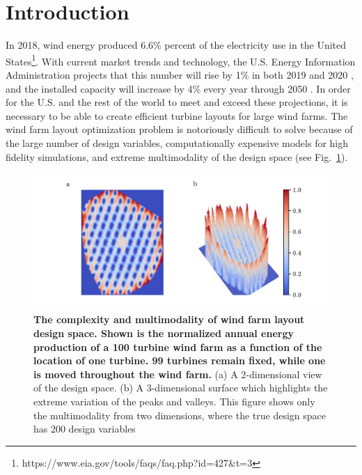\documentclass[wes, manuscript]{copernicus}
\begin{document}
\author[]{Andrew P.J. Stanley and Andrew Ning}





\section{Introduction}

In 2018, wind energy produced 6.6\% percent of the electricity use in the United States\footnote{https://www.eia.gov/tools/faqs/faq.php?id=427\&t=3}. With current market trends and technology, the U.S. Energy Information Administration projects that this number will rise by 1\% in both 2019 and 2020 \citep{outlook2019energy}, and the installed capacity will increase by 4\% every year through 2050 \citep{outlook2050}. In order for the U.S. and the rest of the world to meet and exceed these projections, it is necessary to be able to create efficient turbine layouts for large wind farms.
The wind farm layout optimization problem is notoriously difficult to solve because of the large number of design variables, computationally expensive models for high fidelity simulations, and extreme multimodality of the design space (see Fig.~\ref{mm}). 
%
\begin{figure}
\centering
\includegraphics{paper-figures/mm2}
\caption{\textbf{The complexity and multimodality of wind farm layout design space. Shown is the normalized annual energy production of a 100 turbine wind farm as a function of the location of one turbine. 99 turbines remain fixed, while one is moved throughout the wind farm.} (a) A 2-dimensional view of the design space. (b) A 3-dimensional surface which highlights the extreme variation of the peaks and valleys. This figure shows only the multimodality from two dimensions, where the true design space has 200 design variables}
\label{mm}
\end{figure}
\end{document}

